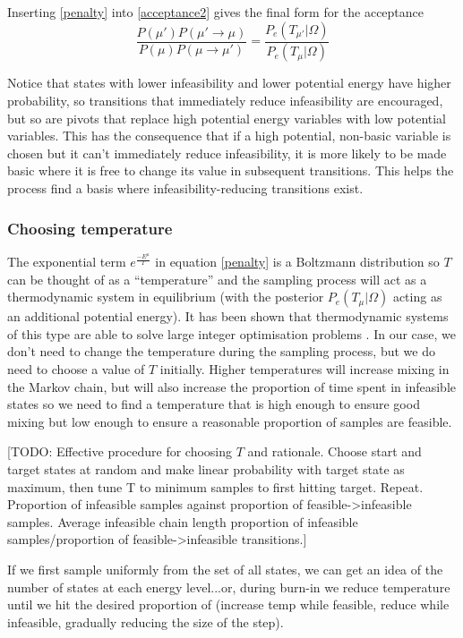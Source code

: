 \documentclass{article}
\begin{document}
Inserting \eqref{penalty} into \eqref{acceptance2} gives the final form for the acceptance
\begin{equation}
\frac{P(\mu')P(\mu'\to\mu)}{P(\mu)P(\mu\to\mu')} 
=
\frac{P_e(T_{\mu'}|\Omega)}{P_e(T_\mu|\Omega)}
\end{equation}

Notice that states with lower infeasibility and lower potential energy have higher probability, so transitions that immediately reduce infeasibility are encouraged, but so are pivots that replace high potential energy variables with low potential variables. This has the consequence that if a high potential, non-basic variable is chosen but it can't immediately reduce infeasibility, it is more likely to be made basic where it is free to change its value in subsequent transitions. This helps the process find a basis where infeasibility-reducing transitions exist.

\subsubsection{Choosing temperature}
The exponential term $e^{\frac{-E^\mu}{T}}$ in equation \eqref{penalty} is a Boltzmann distribution so $T$ can be thought of as a ``temperature'' and the sampling process will act as a thermodynamic system in equilibrium (with the posterior $P_e(T_\mu|\Omega)$ acting as an additional potential energy).  It has been shown that thermodynamic systems of this type are able to solve large integer optimisation problems \cite{kirkpatrick1983optimization}. In our case, we don't need to change the temperature during the sampling process, but we do need to choose a value of $T$ initially. Higher temperatures will increase mixing in the Markov chain, but will also increase the proportion of time spent in infeasible states so we need to find a temperature that is high enough to ensure good mixing but low enough to ensure a reasonable proportion of samples are feasible.

[TODO: Effective procedure for choosing $T$ and rationale. Choose start and target states at random and make linear probability with target state as maximum, then tune T to minimum samples to first hitting target. Repeat.
 Proportion of infeasible samples against proportion of feasible->infeasible samples. Average infeasible chain length proportion of infeasible samples/proportion of feasible->infeasible transitions.]
 
 If we first sample uniformly from the set of all states, we can get an idea of the number of states at each energy level...or, during burn-in we reduce temperature until we hit the desired proportion of (increase temp while feasible, reduce while infeasible, gradually reducing the size of the step).
 
\end{document}
